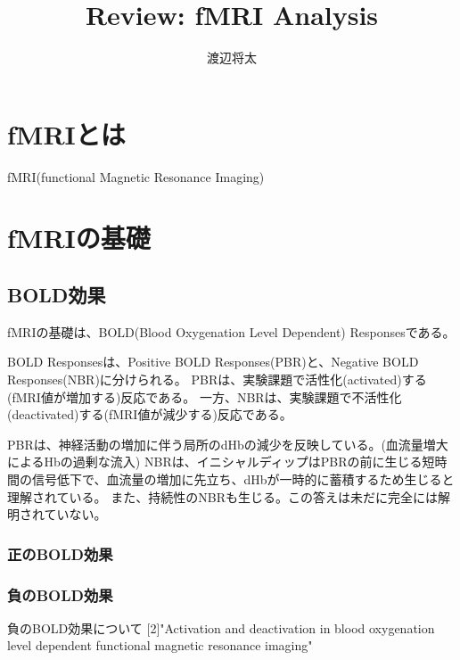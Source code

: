 \documentclass[uplatex, a4j, twocolumn]{article}
\begin{document}
\title{Review: fMRI Analysis}
\author{渡辺将太}

\section{fMRIとは}
fMRI(functional Magnetic Resonance Imaging)

\section{fMRIの基礎}

\subsection{BOLD効果}
fMRIの基礎は、BOLD(Blood Oxygenation Level Dependent) Responsesである。

BOLD Responsesは、Positive BOLD Responses(PBR)と、Negative BOLD Responses(NBR)に分けられる。
PBRは、実験課題で活性化(activated)する(fMRI値が増加する)反応である。
一方、NBRは、実験課題で不活性化(deactivated)する(fMRI値が減少する)反応である。

PBRは、神経活動の増加に伴う局所のdHbの減少を反映している。(血流量増大によるHbの過剰な流入)
NBRは、イニシャルディップはPBRの前に生じる短時間の信号低下で、血流量の増加に先立ち、dHbが一時的に蓄積するため生じると理解されている。
また、持続性のNBRも生じる。この答えは未だに完全には解明されていない。
\subsubsection{正のBOLD効果}
\subsubsection{負のBOLD効果}
負のBOLD効果について
[2]"Activation and deactivation in blood oxygenation level dependent functional magnetic resonance imaging"
\end{document}
